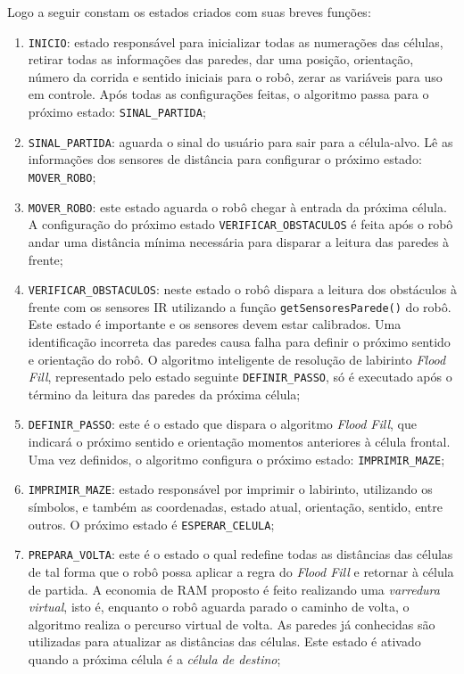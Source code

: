 Logo a seguir constam os estados criados com suas breves funções:
\begin{enumerate}[leftmargin=2cm,label=\alph*)]
	\item \verb+INICIO+: estado responsável para inicializar todas as numerações das células, retirar todas as informações das paredes, dar uma posição, orientação, número da corrida e sentido iniciais para o robô, zerar as variáveis para uso em controle. Após todas as configurações feitas, o algoritmo passa para o próximo estado: \verb+SINAL_PARTIDA+;
	\item \verb+SINAL_PARTIDA+: aguarda o sinal do usuário para sair para a célula-alvo. Lê as informações dos sensores de distância para configurar o próximo estado: \verb+MOVER_ROBO+;
	\item \verb+MOVER_ROBO+: este estado aguarda o robô chegar à entrada da próxima célula. A configuração do próximo estado \verb+VERIFICAR_OBSTACULOS+ é feita após o robô andar uma distância mínima necessária para disparar a leitura das paredes à frente;
	\item \verb+VERIFICAR_OBSTACULOS+: neste estado o robô dispara a leitura dos obstáculos à frente com os sensores IR utilizando a função \verb+getSensoresParede()+ do robô. Este estado é importante e os sensores devem estar calibrados. Uma identificação incorreta das paredes causa falha para definir o próximo sentido e orientação do robô. O algoritmo inteligente de resolução de labirinto \emph{Flood Fill}, representado pelo estado seguinte \verb+DEFINIR_PASSO+, só é executado após o término da leitura das paredes da próxima célula;
	\item \verb+DEFINIR_PASSO+: este é o estado que dispara o algoritmo \emph{Flood Fill}, que indicará o próximo sentido e orientação momentos anteriores à célula frontal. Uma vez definidos, o algoritmo configura o próximo estado: \verb+IMPRIMIR_MAZE+;
	\item \verb+IMPRIMIR_MAZE+: estado responsável por imprimir o labirinto, utilizando os símbolos, e também as coordenadas, estado atual, orientação, sentido, entre outros. O próximo estado é \verb+ESPERAR_CELULA+;
	\item \verb+PREPARA_VOLTA+: este é o estado o qual redefine todas as distâncias das células de tal forma que o robô possa aplicar a regra do \emph{Flood Fill} e retornar à célula de partida. A economia de RAM proposto é feito realizando uma \emph{varredura virtual}, isto é, enquanto o robô aguarda parado o caminho de volta, o algoritmo realiza o percurso virtual de volta. As paredes já conhecidas são utilizadas para atualizar as distâncias das células. Este estado é ativado quando a próxima célula é a \emph{célula de destino};

\end{enumerate}
